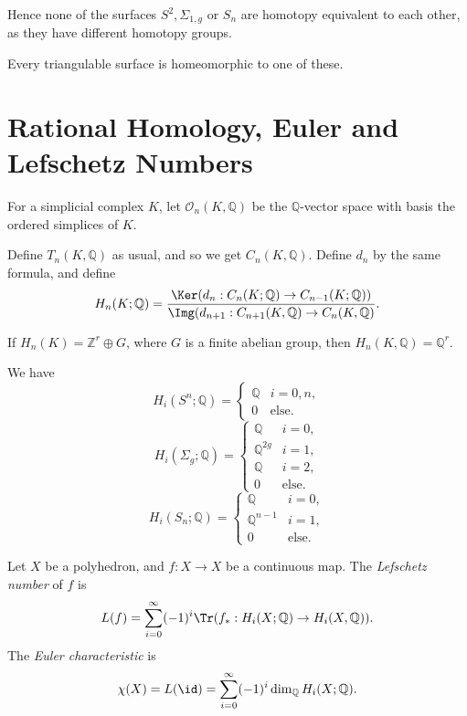 \documentclass[12pt]{article}
\begin{document}
Hence none of the surfaces $S^2, \Sigma_{1, g}$ or $S_n$ are homotopy equivalent to each other, as they have different homotopy groups.

\begin{theorem}
	Every triangulable surface is homeomorphic to one of these.
\end{theorem}

\section{Rational Homology, Euler and Lefschetz Numbers}%
\label{sec:rational_hom}

\begin{definition}
	For a simplicial complex $K$, let $\mathcal{O}_n(K, \mathbb{Q})$ be the $\mathbb{Q}$-vector space with basis the ordered simplices of $K$.

	Define $T_n(K, \mathbb{Q})$ as usual, and so we get $C_n(K, \mathbb{Q})$. Define $d_n$ by the same formula, and define
	\[
	H_n(K ; \mathbb{Q}) = \frac{\Ker(d_n : C_n(K; \mathbb{Q}) \to C_{n-1}(K; \mathbb{Q}))}{\Img(d_{n+1}: C_{n+1}(K, \mathbb{Q}) \to C_n(K, \mathbb{Q})}.
	\]
\end{definition}

\begin{lemma}
	If $H_n(K) = \mathbb{Z}^r \oplus G$, where $G$ is a finite abelian group, then $H_n(K, \mathbb{Q}) = \mathbb{Q}^r$.
\end{lemma}

\begin{exbox}
	We have
	\[
	H_i(S^n; \mathbb{Q}) =
	\begin{cases}
		\mathbb{Q} & i = 0, n,\\
		0 &\text{else}.
	\end{cases}
	\]
	\[
	H_i(\Sigma_g; \mathbb{Q}) =
	\begin{cases}
		\mathbb{Q} & i = 0,\\
		\mathbb{Q}^{2g} & i = 1, \\
		\mathbb{Q} & i = 2,\\
		0 &\text{else}.
	\end{cases}
	\]
	\[
	H_i(S_n; \mathbb{Q}) =
	\begin{cases}
		\mathbb{Q} & i = 0,\\
		\mathbb{Q}^{n-1} & i = 1, \\
		0 &\text{else}.
	\end{cases}
	\]
\end{exbox}

\begin{definition}
	Let $X$ be a polyhedron, and $f : X \to X$ be a continuous map. The \emph{Lefschetz number} of $f$ is
	\[
	L(f) = \sum_{i = 0}^\infty (-1)^i \Tr(f_\ast : H_i(X; \mathbb{Q}) \to H_i(X, \mathbb{Q})).
	\]
	The \emph{Euler characteristic} is 
	\[
		\chi(X) = L(\id) = \sum_{i = 0}^\infty (-1)^i \dim_{\mathbb{Q}} H_i(X; \mathbb{Q}).
	\]
\end{definition}
\end{document}
